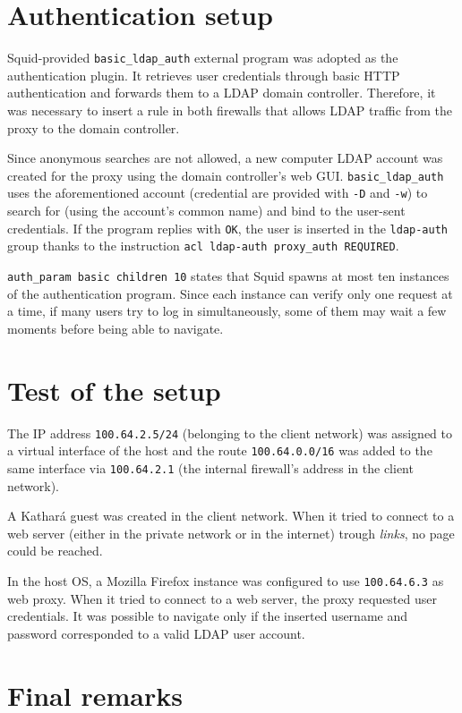 \documentclass[draft]{homework}
\newcommand{\kat}{Kathará\xspace}
\newcommand{\sq}{Squid\xspace}
\begin{document}
    
    \section{Authentication setup}
    \sq-provided \texttt{basic\_ldap\_auth} external program was adopted as the authentication plugin.
    It retrieves user credentials through basic HTTP authentication and forwards them to a LDAP domain controller.
    Therefore, it was necessary to insert a rule in both firewalls that allows LDAP traffic from the proxy to the domain controller.
    
    Since anonymous searches are not allowed, a new computer LDAP account was created for the proxy using the domain controller's web GUI.
    \texttt{basic\_ldap\_auth} uses the aforementioned account (credential are provided with \texttt{-D} and \texttt{-w}) to search for (using the account's common name) and bind to the user-sent credentials.
    If the program replies with \texttt{OK}, the user is inserted in the \texttt{ldap-auth} group thanks to the instruction \texttt{acl ldap-auth proxy_auth REQUIRED}.
    
    \texttt{auth\_param basic children 10} states that \sq spawns at most ten instances of the authentication program.
    Since each instance can verify only one request at a time, if many users try to log in simultaneously, some of them may wait a few moments before being able to navigate.
    
    
    \section{Test of the setup}
    The IP address \texttt{100.64.2.5/24} (belonging to the client network) was assigned to a virtual interface of the host and the route \texttt{100.64.0.0/16} was added to the same interface via \texttt{100.64.2.1} (the internal firewall's address in the client network).
    
    A \kat guest was created in the client network.
    When it tried to connect to a web server (either in the private network or in the internet) trough \textit{links}, no page could be reached.
    
    In the host OS, a Mozilla Firefox instance was configured to use \texttt{100.64.6.3} as web proxy.
    When it tried to connect to a web server, the proxy requested user credentials.
    It was possible to navigate only if the inserted username and password corresponded to a valid LDAP user account.
    
    
    \section{Final remarks}
\end{document}
